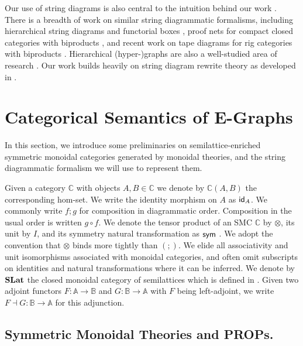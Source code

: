 Our use of string diagrams is also central to the intuition behind our work \cite{Selinger_2010, joyal_geometry_1991}.  
There is a breadth of work on similar string diagrammatic formalisms,  including hierarchical string diagrams \cite{ghica-zanassi2023string} and functorial boxes \cite{mellies_functorial_2006},  proof nets for compact closed categories with biproducts \cite{duncan_generalised_2009}, and recent work on tape diagrams for rig categories with biproducts \cite{bonchi_tape_nodate}. 
Hierarchical (hyper-)graphs are also a well-studied area of research \cite{plump:hierarchical-graphs, montanari:gs-lambda, palacz:hierarchical-transform, Gaducci:hierarchical-graphs, Ghica:hierarchical}. 
Our work builds heavily on string diagram rewrite theory as developed in \cite{bonchi_string_2022-1,bonchi_string_2022-2, bonchi_string_2022-3}. 

\section{Categorical Semantics of E-Graphs}
In this section,  we introduce some preliminaries on semilattice-enriched symmetric monoidal categories generated by monoidal theories,  and the string diagrammatic formalism we will use to represent them.  

Given a category $\mathbb{C}$  with objects $A,B \in \mathbb{C}$ we denote by $\mathbb{C}(A,B)$ the corresponding hom-set.  
We write the identity morphism on $A$ as $\textsf{id}_A$.  
We commonly write $f;g$ for composition in diagrammatic order.  
Composition in the usual order is written $g \circ f$.  
We denote the tensor product of an SMC $\mathbb{C}$ by $\otimes$,  its unit by $I$, and its symmetry natural transformation as $\textsf{sym}$ \cite{maclane}.  
We adopt the convention that $\otimes$ binds more tightly than $(;\!)$.  
We elide all associativity and unit isomorphisms associated with monoidal categories,  and often omit subscripts on identities and natural transformations where it can be inferred.  
We denote by $\mathbf{SLat}$ the closed monoidal category of semilattices which is defined in .
Given two adjoint functors $F : \mathbb{A} \to \mathbb{B}$ and $G : \mathbb{B} \to \mathbb{A}$ with $F$ being left-adjoint, we write $F \dashv G : \mathbb{B} \to \mathbb{A}$ for this adjunction.


\subsection{Symmetric Monoidal Theories and PROPs.}

